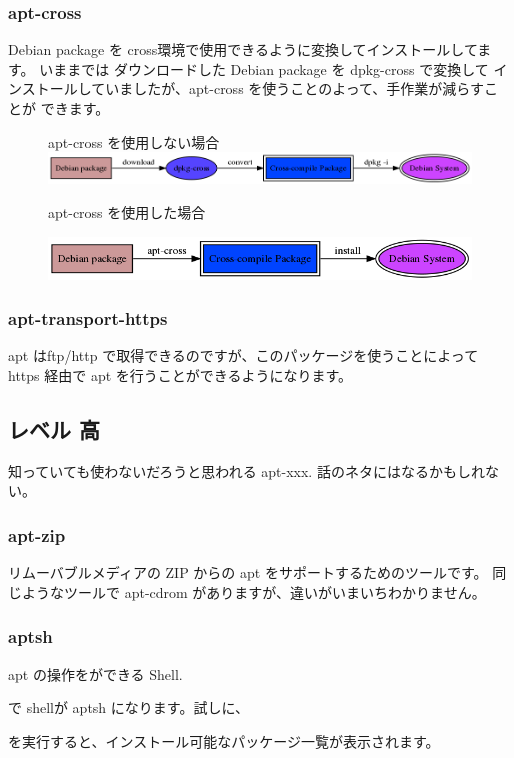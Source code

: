 \documentclass[mingoth,a4paper]{jsarticle}
\begin{document}
\subsubsection{apt-cross}
 Debian package を cross環境で使用できるように変換してインストールしてます。
 いままでは ダウンロードした Debian package を dpkg-cross で変換して
 インストールしていましたが、apt-cross を使うことのよって、手作業が減らすことが
 できます。

 \begin{figure}[h]
 \begin{center}
apt-cross を使用しない場合
 \includegraphics[width=16cm]{image200709/apt-cross.png}
 \end{center}
 \end{figure}

 \begin{figure}[h]
 \begin{center}
apt-cross を使用した場合

 \includegraphics[width=12cm]{image200709/apt-cross-e.png}
 \end{center}
 \end{figure}

\subsubsection{apt-transport-https}
 apt はftp/http で取得できるのですが、このパッケージを使うことによって
 https 経由で apt を行うことができるようになります。
\subsection{レベル 高}
 知っていても使わないだろうと思われる apt-xxx.
 話のネタにはなるかもしれない。
\subsubsection{apt-zip}
 リムーバブルメディアの ZIP からの apt をサポートするためのツールです。
 同じようなツールで apt-cdrom がありますが、違いがいまいちわかりません。

\subsubsection{aptsh}
 apt の操作をができる Shell.
\begin{commandline}
\end{commandline} 
 で shellが aptsh になります。試しに、
\begin{commandline}
\end{commandline}
 を実行すると、インストール可能なパッケージ一覧が表示されます。
 
\end{document}
